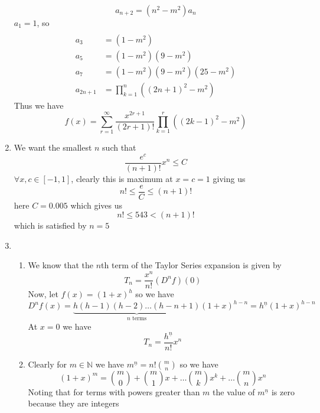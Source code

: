 \documentclass[12pt]{article}
\begin{document}
\begin{enumerate}
$$			a_{n+2} = ( n^{2} -m^{2} ) a_{n}
			$$
			$a_{1}= 1$, so
			$$
			\begin{aligned} \\
				a_{3}  & =(1-m^{2}) \\
				a_{5}  & = (1-m^{2})(9-m^{2}) \\
				a_{7}  & = (1-m^{2})(9-m^{2})(25-m^{2}) \\
				a_{2n+1} & = \prod_{k=1}^{n} ((2n+1)^{2} -m^{2})
			\end{aligned}
			$$
			Thus we have
			$$
			f(x) = \sum_{r=1}^{\infty} \frac{x^{2r+1}}{(2r+1)!} \prod_{k=1}^{r} ((2k-1)^{2} -m^{2})
			$$
		\item
			We want the smallest $n$ such that
			$$
			\frac{e^{c}}{(n+1)!}x^{n} \leq C
			$$
			$\forall x,c \in [-1,1]$, clearly this is maximum at $x=c=1$ giving us
			$$
			n!\leq\frac{e}{C}\leq(n+1)!
			$$
			here $C=0.005$ which gives us
			$$
			n! \leq 543 < (n+1)!
			$$
			which is satisfied by $n=5$
		\item
			\begin{enumerate}
				\item
					We know that the $n$th term of the Taylor Series expansion is given by
					$$
					T_{n} = \frac{x^{n}}{n!}(D^{n}f)(0)
					$$
					Now, let $f(x)= (1+x)^{h}$ so we have
					$$
					D^{n}f(x) = \underbrace{ h(h-1)(h-2)\dots(h-n+1) }_{ n \text{ terms} } (1+x)^{h-n} = h^{\underline{n}}(1+x)^{h-n}
					$$
					At $x=0$ we have
					$$
					T_{n} = \frac{h^{\underline{n}}}{n!}x^{n}
					$$
				\item
					Clearly for $m \in \mathbb{N}$ we have $m^{\underline{n} } = n! \binom{m}{n}$ so we have
					$$
					(1+x)^{m} = \binom{m}{0} + \binom{m}{1}x + \dots \binom{m}{k}x^{k} + \dots \binom{m}{n} x^{n}
					$$
					Noting that for terms with powers greater than $m$ the value of $m^{\underline{n}}$ is zero because they are integers

			\end{enumerate}


\end{enumerate}
\end{document}
